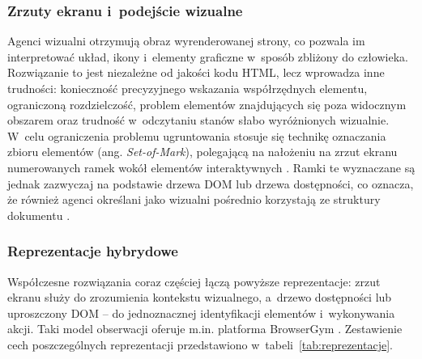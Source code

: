 \subsubsection{Zrzuty ekranu i~podejście wizualne}
Agenci wizualni otrzymują obraz wyrenderowanej strony, co pozwala im interpretować układ, ikony i~elementy graficzne w~sposób zbliżony do człowieka. Rozwiązanie to jest niezależne od jakości kodu HTML, lecz wprowadza inne trudności: konieczność precyzyjnego wskazania współrzędnych elementu, ograniczoną rozdzielczość, problem elementów znajdujących się poza widocznym obszarem oraz trudność w~odczytaniu stanów słabo wyróżnionych wizualnie. W~celu ograniczenia problemu ugruntowania stosuje się technikę oznaczania zbioru elementów (ang. \textit{Set-of-Mark}), polegającą na nałożeniu na zrzut ekranu numerowanych ramek wokół elementów interaktywnych \citep{yang2023som}. Ramki te wyznaczane są jednak zazwyczaj na podstawie drzewa DOM lub drzewa dostępności, co oznacza, że również agenci określani jako wizualni pośrednio korzystają ze struktury dokumentu \citep{he2024webvoyager, koh2024visualwebarena}.

\subsubsection{Reprezentacje hybrydowe}
Współczesne rozwiązania coraz częściej łączą powyższe reprezentacje: zrzut ekranu służy do zrozumienia kontekstu wizualnego, a~drzewo dostępności lub uproszczony DOM -- do jednoznacznej identyfikacji elementów i~wykonywania akcji. Taki model obserwacji oferuje m.in. platforma BrowserGym \citep{chezelles2025browsergym}. Zestawienie cech poszczególnych reprezentacji przedstawiono w~tabeli~\ref{tab:reprezentacje}.


